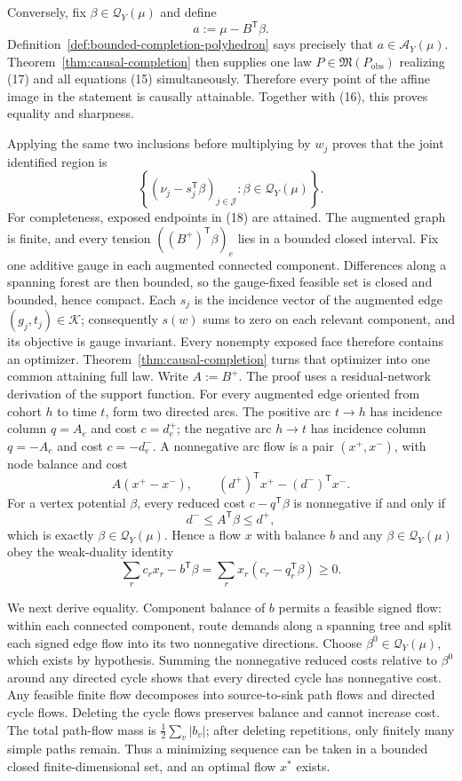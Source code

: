 Conversely, fix \(\beta\in\mathcal Q_Y(\mu)\) and define
\[
 a:=\mu-B^{\mathsf T}\beta.
\tag{17}
\]
Definition~\ref{def:bounded-completion-polyhedron} says precisely that \(a\in\mathcal A_Y(\mu)\).  Theorem~\ref{thm:causal-completion} then supplies one law \(P\in\mathfrak M(P_{\mathrm{obs}})\) realizing (17) and all equations (15) simultaneously.  Therefore every point of the affine image in the statement is causally attainable.  Together with (16), this proves equality and sharpness.

Applying the same two inclusions before multiplying by \(w_j\) proves that the joint identified region is
\[
 \left\{(\nu_j-s_j^{\mathsf T}\beta)_{j\in\mathcal J}:
 \beta\in\mathcal Q_Y(\mu)\right\}.
\tag{18}
\]
For completeness, exposed endpoints in (18) are attained.  The augmented graph is finite, and every tension \(((B^+)^{\mathsf T}\beta)_e\) lies in a bounded closed interval.  Fix one additive gauge in each augmented connected component.  Differences along a spanning forest are then bounded, so the gauge-fixed feasible set is closed and bounded, hence compact.  Each \(s_j\) is the incidence vector of the augmented edge \((g_j,t_j)\in\mathcal K\); consequently \(s(w)\) sums to zero on each relevant component, and its objective is gauge invariant.  Every nonempty exposed face therefore contains an optimizer.  Theorem~\ref{thm:causal-completion} turns that optimizer into one common attaining full law.
Write \(A:=B^+\).  The proof uses a residual-network derivation of the support function.  For every augmented edge oriented from cohort \(h\) to time \(t\), form two directed arcs.  The positive arc \(t\to h\) has incidence column \(q=A_e\) and cost \(c=d^+_e\); the negative arc \(h\to t\) has incidence column \(q=-A_e\) and cost \(c=-d^-_e\).  A nonnegative arc flow is a pair \((x^+,x^-)\), with node balance and cost
\[
 A(x^+-x^-),
 \qquad
 (d^+)^{\mathsf T}x^+-(d^-)^{\mathsf T}x^-.
\tag{19}
\]
For a vertex potential \(\beta\), every reduced cost \(c-q^{\mathsf T}\beta\) is nonnegative if and only if
\[
 d^-\le A^{\mathsf T}\beta\le d^+,
\tag{20}
\]
which is exactly \(\beta\in\mathcal Q_Y(\mu)\).  Hence a flow \(x\) with balance \(b\) and any \(\beta\in\mathcal Q_Y(\mu)\) obey the weak-duality identity
\[
 \sum_r c_rx_r-b^{\mathsf T}\beta
 =\sum_r x_r(c_r-q_r^{\mathsf T}\beta)\ge0.
\tag{21}
\]

We next derive equality.  Component balance of \(b\) permits a feasible signed flow: within each connected component, route demands along a spanning tree and split each signed edge flow into its two nonnegative directions.  Choose \(\beta^0\in\mathcal Q_Y(\mu)\), which exists by hypothesis.  Summing the nonnegative reduced costs relative to \(\beta^0\) around any directed cycle shows that every directed cycle has nonnegative cost.  Any feasible finite flow decomposes into source-to-sink path flows and directed cycle flows.  Deleting the cycle flows preserves balance and cannot increase cost.  The total path-flow mass is \(\frac12\sum_v|b_v|\); after deleting repetitions, only finitely many simple paths remain.  Thus a minimizing sequence can be taken in a bounded closed finite-dimensional set, and an optimal flow \(x^*\) exists.

